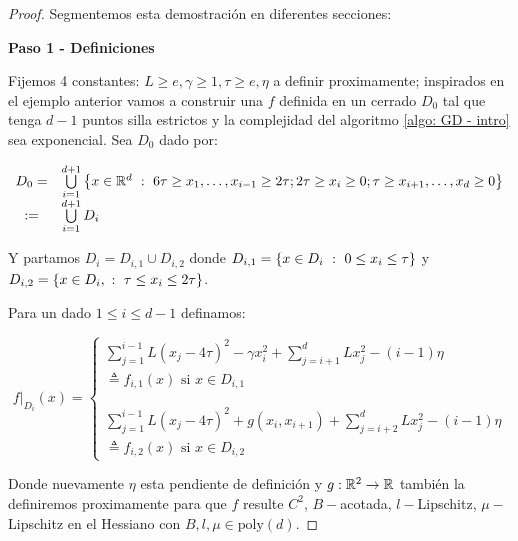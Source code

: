 \begin{proof} Segmentemos esta demostraci\'on en diferentes secciones:
		
	\medskip
	
	\textbf{Paso 1 - Definiciones}
	
	\medskip
	
	Fijemos 4 constantes: $L\geq e, \gamma \geq  1, \tau \geq  e, \eta$ a definir proximamente; inspirados en el ejemplo anterior vamos a construir una $f$ definida en un cerrado $D_0$ tal que tenga $d-1$ puntos silla estrictos y la complejidad del algoritmo \ref{algo: GD - intro} sea exponencial. Sea $D_0$ dado por:
	
	\begin{equation}
	\begin{array}{cl}
	D_ 0 = & \bigcup\limits_{i=1}^{d+1} \left\lbrace x \in {\mathbb{R}}^d ~:~ 6\tau \geq x_1, \dots, x_{i-1} \geq 2\tau; 2\tau \geq x_i \geq 0 ; \tau \geq x_{i+1}, \dots, x_d \geq 0 \right\rbrace  \\
	:= & \bigcup\limits_{i=1}^{d+1}{D_i}
	\end{array}
	\end{equation}
	
	Y partamos $D_i = D_{i,1} \cup D_{i,2}$ donde $D_{i,1} = \left\lbrace x \in D_i ~:~ 0 \leq x_i \leq \tau\right\rbrace$ y $D_{i,2} = \left\lbrace x \in D_i, ~:~ \tau \leq x_i \leq 2\tau\right\rbrace$.
	
	Para un dado $1 \leq i \leq d-1$ definamos:
	
	\begin{equation}
	f\vert_{D_i}(x) = \left\lbrace \begin{array}{l}
	\sum\limits_{j=1}^{i-1}{L \left(x_j - 4\tau\right)^2}  - \gamma x_i^2 + \sum\limits_{j={i+1}}^{d} {L x_j^2 - \left(i-1\right)\eta } \\
	\triangleq f_{i,1}(x) \text{ si } x\in D_{i,1} \\
	\\
	\\
	\sum\limits_{j=1}^{i-1}{L \left(x_j - 4\tau\right)^2}  + g(x_i, x_{i+1})+ \sum\limits_{j={i+2}}^{d} {L x_j^2 - \left(i-1\right)\eta } \\ \triangleq f_{i,2}(x)  \text{ si } x\in D_{i,2}
	\end{array}\right.
	\end{equation}
	
	Donde nuevamente $\eta$ esta pendiente de definici\'on y $g: {\mathbb{R}}^2 \rightarrow {\mathbb{R}}$ tambi\'en la definiremos proximamente para que $f$ resulte $C^2$, $B-$acotada, $l-$Lipschitz, $\mu-$Lipschitz en el Hessiano con $B,l,\mu \in \text{poly}(d)$. 
	

\end{proof}
